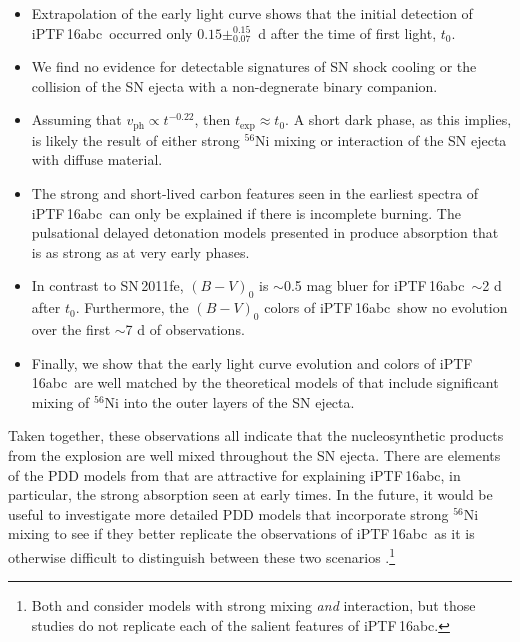 \documentclass[twocolumn]{aastex61}
\newcommand{\abc}{iPTF\,16abc}
\begin{document}
\begin{itemize}
    \item Extrapolation of the early light curve shows that the initial detection of \abc\ occurred only $0.15\pm_{0.07}^{0.15}$~d after the time of first light, $t_0$.

    \item We find no evidence for detectable signatures of SN shock cooling or the collision of the SN ejecta with a non-degnerate binary companion.

    \item Assuming that $v_\mathrm{ph} \propto t^{-0.22}$, then $t_\mathrm{exp} \approx t_0$. A short dark phase, as this implies, is likely the result of either strong $^{56}$Ni mixing or interaction of the SN ejecta with diffuse material.

    \item The strong and short-lived carbon features seen in the 
earliest spectra of \abc\ can only be explained if there is incomplete burning. The pulsational delayed detonation models presented in \citet{2014MNRAS.441..532D} produce  absorption that is as strong as  at very early phases.

    \item In contrast to SN\,2011fe, $(B - V)_0$ is $\sim$0.5 mag bluer for \abc\ $\sim$2 d after $t_0$. Furthermore, the $(B - V)_0$ colors of \abc\ show no evolution over the first $\sim$7 d  of observations.

    \item Finally, we show that the early light curve evolution and colors of \abc\ are well matched by the theoretical models of \citet{2016ApJ...826...96P} that include significant mixing of $^{56}$Ni into the outer layers of the SN ejecta. 
 
\end{itemize}
%
Taken together, these observations all indicate that the nucleosynthetic products from the explosion are well mixed throughout the SN ejecta. There are elements of the PDD models from \citet{2014MNRAS.441..532D} that are attractive for explaining \abc, in particular, the strong  absorption seen at early times. In the future, it would be useful to investigate more detailed PDD models that incorporate strong $^{56}$Ni mixing to see if they better replicate the observations of \abc\ as it is otherwise difficult to distinguish between these two scenarios \citep{2017arXiv170603613N}.\footnote{Both \citet{2014MNRAS.441..532D} and \citet{2016ApJ...826...96P} consider models with strong mixing \textit{and} interaction, but those studies do not replicate each of the salient features of \abc.}  
\end{document}
